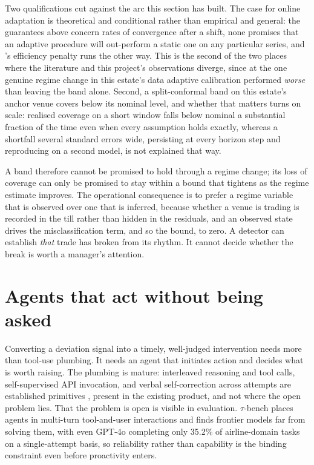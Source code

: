 Two qualifications cut against the arc this section has built. The case for
online adaptation is theoretical and conditional rather than empirical and
general: the guarantees above concern rates of convergence after a shift, none
promises that an adaptive procedure will out-perform a static one on any
particular series, and \citet{zaffran_adaptive_2022}'s efficiency penalty runs
the other way. This is the second of the two places where the literature and this
project's observations diverge, since at the one genuine regime change in this
estate's data adaptive calibration performed \emph{worse} than leaving the band
alone. Second, a split-conformal band on this estate's anchor venue covers below
its nominal level, and whether that matters turns on scale: realised coverage on
a short window falls below nominal a substantial fraction of the time even when
every assumption holds exactly, whereas a shortfall several standard errors wide,
persisting at every horizon step and reproducing on a second model, is not
explained that way.

A band therefore cannot be promised to hold through a regime change; its loss of
coverage can only be promised to stay within a bound that tightens as the regime
estimate improves. The operational consequence is to prefer a regime variable
that is observed over one that is inferred, because whether a venue is trading is
recorded in the till rather than hidden in the residuals, and an observed state
drives the misclassification term, and so the bound, to zero. A detector can
establish \emph{that} trade has broken from its rhythm. It cannot decide whether
the break is worth a manager's attention.

\section{Agents that act without being asked}
\label{sec:rw-surfacing}

Converting a deviation signal into a timely, well-judged intervention needs more
than tool-use plumbing. It needs an agent that initiates action and decides what
is worth raising. The plumbing is mature: interleaved reasoning and tool calls,
self-supervised API invocation, and verbal self-correction across attempts are
established primitives
\citep{yao_react_2022,schick_toolformer_2023,shinn_reflexion_2023}, present in
the existing product, and not where the open problem lies. That the problem is
open is visible in evaluation. $\tau$-bench
\citep[a 2024 preprint]{yao_-bench_2024} places agents in multi-turn
tool-and-user interactions and finds frontier models far from solving them, with
even GPT-4o completing only 35.2\% of airline-domain tasks on a single-attempt
basis, so reliability rather than capability is the binding constraint even
before proactivity enters.


